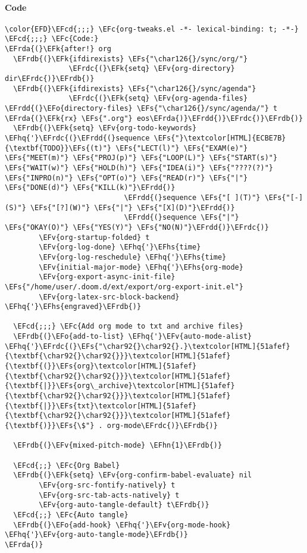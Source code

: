 \documentclass[a4wide,10pt]{article}
\newcommand{\EFc}[1]{\textcolor{EFc}{#1}} %
\newcommand{\EFcd}[1]{\textcolor{EFcd}{#1}} %
\newcommand{\EFs}[1]{\textcolor{EFs}{#1}} %
\newcommand{\EFk}[1]{\textcolor{EFk}{#1}} %
\newcommand{\EFv}[1]{\textcolor{EFv}{#1}} %
\newcommand{\EFo}[1]{\textcolor{EFo}{#1}} %
\newcommand{\EFhn}[1]{\textcolor{EFhn}{\textbf{#1}}} %
\newcommand{\EFhq}[1]{\textcolor{EFhq}{#1}} %
\newcommand{\EFhs}[1]{\textcolor{EFhs}{#1}} %
\newcommand{\EFrda}[1]{\textcolor{EFrda}{#1}} %
\newcommand{\EFrdb}[1]{\textcolor{EFrdb}{#1}} %
\newcommand{\EFrdc}[1]{\textcolor{EFrdc}{#1}} %
\newcommand{\EFrdd}[1]{\textcolor{EFrdd}{#1}} %
\begin{document}
\paragraph{Code}
\label{sec:orgf9b50ed}
\begin{Code}
\begin{Verbatim}
\color{EFD}\EFcd{;;;} \EFc{org-tweaks.el -*- lexical-binding: t; -*-}
\EFcd{;;;} \EFc{Code:}
\EFrda{(}\EFk{after!} org
  \EFrdb{(}\EFk{ifdirexists} \EFs{"\char126{}/sync/org/"}
               \EFrdc{(}\EFk{setq} \EFv{org-directory} dir\EFrdc{)}\EFrdb{)}
  \EFrdb{(}\EFk{ifdirexists} \EFs{"\char126{}/sync/agenda"}
               \EFrdc{(}\EFk{setq} \EFv{org-agenda-files} \EFrdd{(}\EFo{directory-files} \EFs{"\char126{}/sync/agenda/"} t \EFrda{(}\EFk{rx} \EFs{".org"} eos\EFrda{)}\EFrdd{)}\EFrdc{)}\EFrdb{)}
  \EFrdb{(}\EFk{setq} \EFv{org-todo-keywords} \EFhq{'}\EFrdc{(}\EFrdd{(}sequence \EFs{"}\textcolor[HTML]{ECBE7B}{\textbf{TODO}}\EFs{(t)"} \EFs{"LECT(l)"} \EFs{"EXAM(e)"} \EFs{"MEET(m)"} \EFs{"PROJ(p)"} \EFs{"LOOP(L)"} \EFs{"START(s)"} \EFs{"WAIT(w)"} \EFs{"HOLD(h)"} \EFs{"IDEA(i)"} \EFs{"????(?)"} \EFs{"INPRO(n)"} \EFs{"OPT(o)"} \EFs{"READ(r)"} \EFs{"|"} \EFs{"DONE(d)"} \EFs{"KILL(k)"}\EFrdd{)}
                            \EFrdd{(}sequence \EFs{"[ ](T)"} \EFs{"[-](S)"} \EFs{"[?](W)"} \EFs{"|"} \EFs{"[X](D)"}\EFrdd{)}
                            \EFrdd{(}sequence \EFs{"|"} \EFs{"OKAY(O)"} \EFs{"YES(Y)"} \EFs{"NO(N)"}\EFrdd{)}\EFrdc{)}
        \EFv{org-startup-folded} t
        \EFv{org-log-done} \EFhq{'}\EFhs{time}
        \EFv{org-log-reschedule} \EFhq{'}\EFhs{time}
        \EFv{initial-major-mode} \EFhq{'}\EFhs{org-mode}
        \EFv{org-export-async-init-file} \EFs{"/home/user/.doom.d/ext/export/org-export-init.el"}
        \EFv{org-latex-src-block-backend} \EFhq{'}\EFhs{engraved}\EFrdb{)}

  \EFcd{;;;} \EFc{Add org mode to txt and archive files}
  \EFrdb{(}\EFo{add-to-list} \EFhq{'}\EFv{auto-mode-alist} \EFhq{'}\EFrdc{(}\EFs{"\char92{}\char92{}.}\textcolor[HTML]{51afef}{\textbf{\char92{}\char92{}}}\textcolor[HTML]{51afef}{\textbf{(}}\EFs{org}\textcolor[HTML]{51afef}{\textbf{\char92{}\char92{}}}\textcolor[HTML]{51afef}{\textbf{|}}\EFs{org\_archive}\textcolor[HTML]{51afef}{\textbf{\char92{}\char92{}}}\textcolor[HTML]{51afef}{\textbf{|}}\EFs{txt}\textcolor[HTML]{51afef}{\textbf{\char92{}\char92{}}}\textcolor[HTML]{51afef}{\textbf{)}}\EFs{\$"} . org-mode\EFrdc{)}\EFrdb{)}

  \EFrdb{(}\EFv{mixed-pitch-mode} \EFhn{1}\EFrdb{)}

  \EFcd{;;} \EFc{Org Babel}
  \EFrdb{(}\EFk{setq} \EFv{org-confirm-babel-evaluate} nil
        \EFv{org-src-fontify-natively} t
        \EFv{org-src-tab-acts-natively} t
        \EFv{org-auto-tangle-default} t\EFrdb{)}
  \EFcd{;;} \EFc{Auto tangle}
  \EFrdb{(}\EFo{add-hook} \EFhq{'}\EFv{org-mode-hook} \EFhq{'}\EFv{org-auto-tangle-mode}\EFrdb{)}
\EFrda{)}


\end{Verbatim}
\end{Code}
\end{document}
